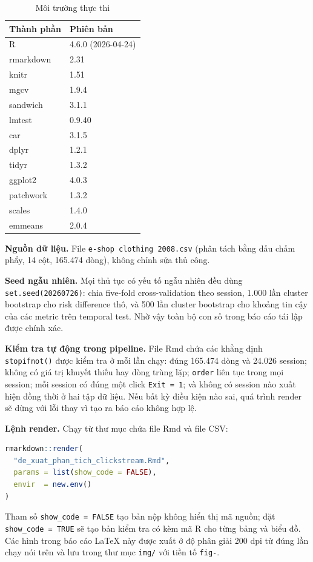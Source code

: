 \begin{table}[H]
\centering
\caption{Môi trường thực thi}
\label{tab:environment}
\small
\begin{tabular}{ll}
\toprule
\textbf{Thành phần} & \textbf{Phiên bản} \\
\midrule
R           & 4.6.0 (2026-04-24) \\
rmarkdown   & 2.31 \\
knitr       & 1.51 \\
mgcv        & 1.9.4 \\
sandwich    & 3.1.1 \\
lmtest      & 0.9.40 \\
car         & 3.1.5 \\
dplyr       & 1.2.1 \\
tidyr       & 1.3.2 \\
ggplot2     & 4.0.3 \\
patchwork   & 1.3.2 \\
scales      & 1.4.0 \\
emmeans     & 2.0.4 \\
\bottomrule
\end{tabular}
\end{table}

\textbf{Nguồn dữ liệu.} File \texttt{e-shop clothing 2008.csv} (phân tách bằng
dấu chấm phẩy, 14 cột, 165.474 dòng), không chỉnh sửa thủ công.

\textbf{Seed ngẫu nhiên.} Mọi thủ tục có yếu tố ngẫu nhiên đều dùng
\texttt{set.seed(20260726)}: chia five-fold cross-validation theo session, 1.000
lần cluster bootstrap cho risk difference thô, và 500 lần cluster bootstrap cho
khoảng tin cậy của các metric trên temporal test. Nhờ vậy toàn bộ con số trong
báo cáo tái lập được chính xác.

\textbf{Kiểm tra tự động trong pipeline.} File Rmd chứa các khẳng định
\texttt{stopifnot()} được kiểm tra ở mỗi lần chạy: đúng 165.474 dòng và 24.026
session; không có giá trị khuyết thiếu hay dòng trùng lặp; \texttt{order} liên
tục trong mọi session; mỗi session có đúng một click \texttt{Exit = 1}; và không
có session nào xuất hiện đồng thời ở hai tập dữ liệu. Nếu bất kỳ điều kiện nào
sai, quá trình render sẽ dừng với lỗi thay vì tạo ra báo cáo không hợp lệ.

\textbf{Lệnh render.} Chạy từ thư mục chứa file Rmd và file CSV:

\begin{lstlisting}[language=R]
rmarkdown::render(
  "de_xuat_phan_tich_clickstream.Rmd",
  params = list(show_code = FALSE),
  envir  = new.env()
)
\end{lstlisting}

Tham số \texttt{show\_code = FALSE} tạo bản nộp không hiển thị mã nguồn; đặt
\texttt{show\_code = TRUE} sẽ tạo bản kiểm tra có kèm mã R cho từng bảng và biểu
đồ. Các hình trong báo cáo LaTeX này được xuất ở độ phân giải 200 dpi từ đúng lần
chạy nói trên và lưu trong thư mục \texttt{img/} với tiền tố \texttt{fig-}.
